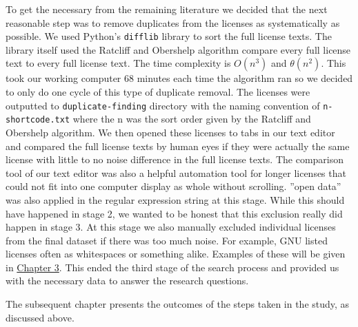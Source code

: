 To get the necessary from the remaining literature we decided that the next reasonable step was to remove duplicates from the licenses as systematically as possible. We used Python's \texttt{difflib} library to sort the full license texts. The library itself used the Ratcliff and Obershelp algorithm compare every full license text to every full license text. The time complexity is $O(n^3)$ and $\theta(n^2)$. This took our working computer 68 minutes each time the algorithm ran so we decided to only do one cycle of this type of duplicate removal. The licenses were outputted to \texttt{duplicate-finding} directory with the naming convention of \texttt{n-shortcode.txt} where the n was the sort order given by the Ratcliff and Obershelp algorithm. We then opened these licenses to tabs in our text editor and compared the full license texts by human eyes if they were actually the same license with little to no noise difference in the full license texts. The comparison tool of our text editor was also a helpful automation tool for longer licenses that could not fit into one computer display as whole without scrolling. ''open data'' was also applied in the regular expression string at this stage. While this should have happened in stage 2, we wanted to be honest that this exclusion really did happen in stage 3. At this stage we also manually excluded individual licenses from the final dataset if there was too much noise. For example, GNU listed licenses often as whitespaces or something alike.  Examples of these will be given in \hyperref[results]{Chapter 3}. This ended the third stage of the search process and provided us with the necessary data to answer the research questions.

The subsequent chapter presents the outcomes of the steps taken in the study, as discussed above.